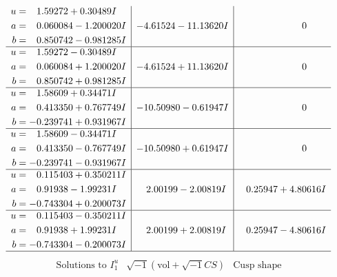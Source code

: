 \documentclass[1p]{elsarticle_modified}
\theoremstyle{definition}
\newcommand{\I}{\sqrt{-1}}
\begin{document}
$$\begin{array}{c|c|c}
\begin{aligned}
u &= \phantom{-}1.59272 + 0.30489 I \\
a &= \phantom{-}0.060084 - 1.200020 I \\
b &= \phantom{-}0.850742 - 0.981285 I\end{aligned}
 & -4.61524 - 11.13620 I & \phantom{-0.000000 } 0 \\ \hline\begin{aligned}
u &= \phantom{-}1.59272 - 0.30489 I \\
a &= \phantom{-}0.060084 + 1.200020 I \\
b &= \phantom{-}0.850742 + 0.981285 I\end{aligned}
 & -4.61524 + 11.13620 I & \phantom{-0.000000 } 0 \\ \hline\begin{aligned}
u &= \phantom{-}1.58609 + 0.34471 I \\
a &= \phantom{-}0.413350 + 0.767749 I \\
b &= -0.239741 + 0.931967 I\end{aligned}
 & -10.50980 - 0.61947 I & \phantom{-0.000000 } 0 \\ \hline\begin{aligned}
u &= \phantom{-}1.58609 - 0.34471 I \\
a &= \phantom{-}0.413350 - 0.767749 I \\
b &= -0.239741 - 0.931967 I\end{aligned}
 & -10.50980 + 0.61947 I & \phantom{-0.000000 } 0 \\ \hline\begin{aligned}
u &= \phantom{-}0.115403 + 0.350211 I \\
a &= \phantom{-}0.91938 - 1.99231 I \\
b &= -0.743304 + 0.200073 I\end{aligned}
 & \phantom{-}2.00199 - 2.00819 I & \phantom{-}0.25947 + 4.80616 I \\ \hline\begin{aligned}
u &= \phantom{-}0.115403 - 0.350211 I \\
a &= \phantom{-}0.91938 + 1.99231 I \\
b &= -0.743304 - 0.200073 I\end{aligned}
 & \phantom{-}2.00199 + 2.00819 I & \phantom{-}0.25947 - 4.80616 I\\
 \hline 
 \end{array}$$\newpage$$\begin{array}{c|c|c}  
\text{Solutions to }I^u_{1}& \I (\text{vol} + \sqrt{-1}CS) & \text{Cusp shape}\\

\end{array}$$
\end{document}
